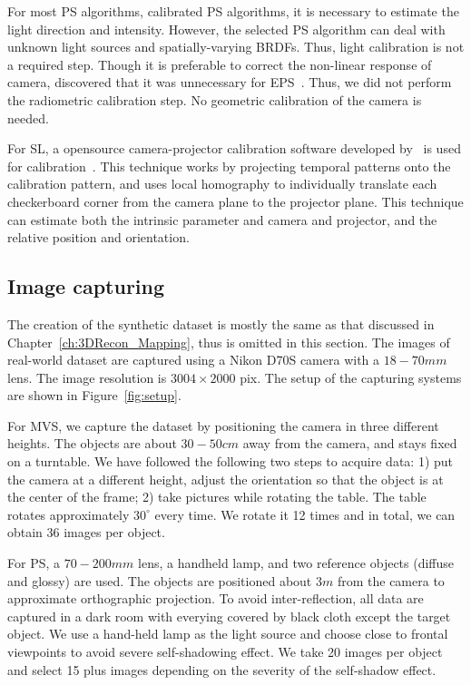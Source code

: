 For most PS algorithms, \ie calibrated PS algorithms, it is necessary to estimate the light direction and intensity. However, the selected PS algorithm can deal with unknown light sources and spatially-varying BRDFs. Thus, light calibration is not a required step. Though it is preferable to correct the non-linear response of camera, \citeauthor{hertzmann2005example} discovered that it was unnecessary for EPS~\cite{hertzmann2005example}. Thus, we did not perform the radiometric calibration step. No geometric calibration of the camera is needed.

For SL, a opensource camera-projector calibration software developed by~\citeauthor{moreno2012simple} is used for calibration~\cite{moreno2012simple}. This technique works by projecting temporal patterns onto the calibration pattern, and uses local homography to individually translate each checkerboard corner from the camera plane to the projector plane. This technique can estimate both the intrinsic parameter and camera and projector, and the relative position and orientation.

\subsection{Image capturing}
The creation of the synthetic dataset is mostly the same as that discussed in Chapter~\ref{ch:3DRecon_Mapping}, thus is omitted in this section. The images of real-world dataset are captured using a Nikon D70S camera with a $18-70mm$ lens. The image resolution is $3004\times 2000$ pix. The setup of the capturing systems are shown in Figure~\ref{fig:setup}.

For MVS, we capture the dataset by positioning the camera in three different heights. The objects are about $30-50cm$ away from the camera, and stays fixed on a turntable. We have followed the following two steps to acquire data: 1) put the camera at a different height, adjust the orientation so that the object is at the center of the frame; 2) take pictures while rotating the table. The table rotates approximately $30^\circ$ every time. We rotate it 12 times and in total, we can obtain 36 images per object.

For PS, a $70-200mm$ lens, a handheld lamp, and two reference objects (diffuse and glossy) are used. The objects are positioned about $3m$ from the camera to approximate orthographic projection. To avoid inter-reflection, all data are captured in a dark room with everying covered by black cloth except the target object. We use a hand-held lamp as the light source and choose close to frontal viewpoints to avoid severe self-shadowing effect. We take 20 images per object and select 15 plus images depending on the severity of the self-shadow effect.

